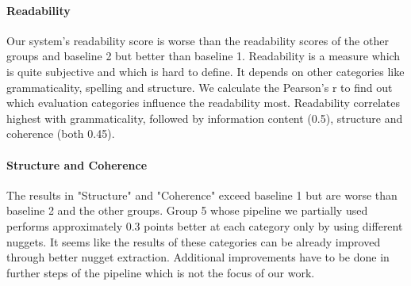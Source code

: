\paragraph{Readability}
Our system's readability score is worse than the readability scores of the other groups and baseline 2 but better than baseline 1. Readability is a measure which is quite subjective and which is hard to define. It depends on other categories like grammaticality, spelling and structure. We calculate the Pearson's r to find out which evaluation categories influence the readability most. Readability correlates highest with grammaticality, followed by information content (0.5), structure and coherence (both 0.45).   

\paragraph{Structure and Coherence}
The results in "Structure" and "Coherence" exceed baseline 1 but are worse than baseline 2 and the other groups. Group 5 whose pipeline we partially used performs approximately 0.3 points better at each category only by using different nuggets. It seems like the results of these categories can be already improved through better nugget extraction. Additional improvements have to be done in further steps of the pipeline which is not the focus of our work.

